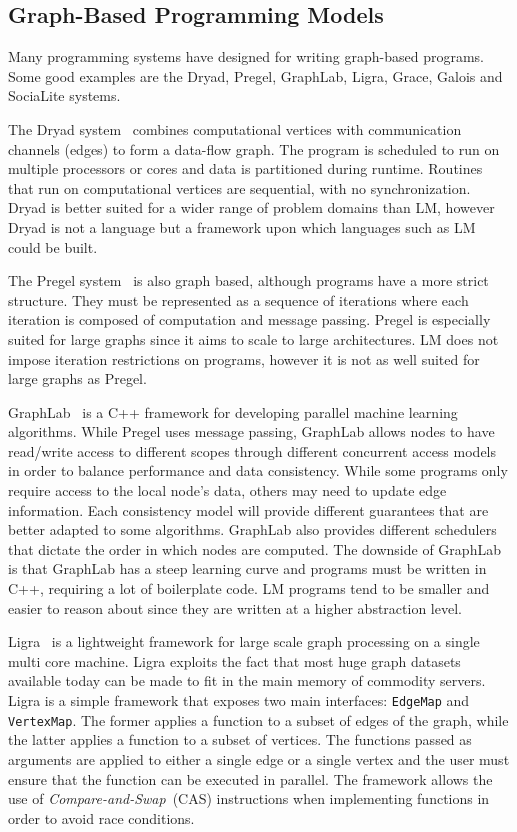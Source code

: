 \subsection{Graph-Based Programming Models}

Many programming systems have designed for writing graph-based programs.  Some
good examples are the Dryad, Pregel, GraphLab, Ligra, Grace, Galois and
SociaLite systems.

The Dryad system~\cite{Isard:2007:DDD:1272996.1273005} combines computational
vertices with communication channels (edges) to form a data-flow graph. The
program is scheduled to run on multiple processors or cores and data is
partitioned during runtime. Routines that run on computational vertices are
sequential, with no synchronization. Dryad is better suited for a wider range of
problem domains than LM, however Dryad is not a language but a framework upon
which languages such as LM could be built.

The Pregel system~\cite{Malewicz:2010:PSL:1807167.1807184} is also graph based,
although programs have a more strict structure. They must be represented as a
sequence of iterations where each iteration is composed of computation and
message passing. Pregel is especially suited for large graphs since it aims to
scale to large architectures. LM does not impose iteration restrictions on
programs, however it is not as well suited for large graphs as Pregel.

GraphLab~\cite{GraphLab2010} is a C++ framework for developing parallel machine
learning algorithms. While Pregel uses message passing, GraphLab allows nodes to
have read/write access to different scopes through different concurrent access
models in order to balance performance and data consistency. While some programs
only require access to the local node's data, others may need to update edge
information. Each consistency model will provide different guarantees that are
better adapted to some algorithms. GraphLab also provides different schedulers
that dictate the order in which nodes are computed. The downside of GraphLab is
that GraphLab has a steep learning curve and programs must be written in C++,
requiring a lot of boilerplate code. LM programs tend to be smaller and easier to
reason about since they are written at a higher abstraction level.

Ligra~\cite{Shun:2013:LLG:2517327.2442530} is a lightweight framework for large
scale graph processing on a single multi core machine. Ligra exploits the fact
that most huge graph datasets available today can be made to fit in the main
memory of commodity servers. Ligra is a simple framework that exposes two main
interfaces: \texttt{EdgeMap} and \texttt{VertexMap}. The former applies a
function to a subset of edges of the graph, while the latter applies a function
to a subset of vertices. The functions passed as arguments are applied to either
a single edge or a single vertex and the user must ensure that the function can
be executed in parallel. The framework allows the use of
\emph{Compare-and-Swap}~(CAS) instructions when implementing functions in order
to avoid race conditions.

